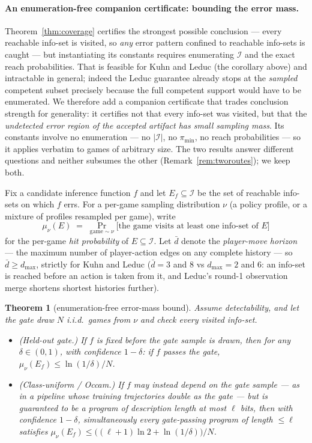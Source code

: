 \documentclass[11pt]{article}
\newtheorem{theorem}{Theorem}
\theoremstyle{remark}
\newcommand{\dmax}{d_{\max}}
\newcommand{\Ireach}{\mathcal{I}}
\begin{document}
\paragraph{An enumeration-free companion certificate: bounding the error mass.}
Theorem~\ref{thm:coverage} certifies the strongest possible conclusion --- every reachable info-set is visited, so \emph{any} error pattern confined to reachable info-sets is caught --- but instantiating its constants requires enumerating $\Ireach$ and the exact reach probabilities. That is feasible for Kuhn and Leduc (the corollary above) and intractable in general; indeed the Leduc guarantee already stops at the \emph{sampled} competent subset precisely because the full competent support would have to be enumerated. We therefore add a companion certificate that trades conclusion strength for generality: it certifies not that every info-set was visited, but that the \emph{undetected error region of the accepted artifact has small sampling mass}. Its constants involve no enumeration --- no $|\Ireach|$, no $\pi_{\min}$, no reach probabilities --- so it applies verbatim to games of arbitrary size. The two results answer different questions and neither subsumes the other (Remark~\ref{rem:tworoutes}); we keep both.

Fix a candidate inference function $f$ and let $E_f \subseteq \Ireach$ be the set of reachable info-sets on which $f$ errs. For a per-game sampling distribution $\nu$ (a policy profile, or a mixture of profiles resampled per game), write
\[
\mu_\nu(E) \;=\; \Pr_{\text{game} \sim \nu}\!\big[\text{the game visits at least one info-set of } E\big]
\]
for the per-game \emph{hit probability} of $E \subseteq \Ireach$. Let $\bar d$ denote the \emph{player-move horizon} --- the maximum number of player-action edges on any complete history --- so $\bar d \geq \dmax$, strictly for Kuhn and Leduc ($\bar d = 3$ and $8$ vs $\dmax = 2$ and $6$: an info-set is reached before an action is taken from it, and Leduc's round-1 observation merge shortens shortest histories further).

\begin{theorem}[enumeration-free error-mass bound]
\label{thm:errormass}
Assume detectability, and let the gate draw $N$ i.i.d.\ games from $\nu$ and check every visited info-set.
\begin{itemize}
\item[(i)] (\emph{Held-out gate.}) If $f$ is fixed before the gate sample is drawn, then for any $\delta \in (0,1)$, with confidence $1-\delta$: if $f$ passes the gate, $\mu_\nu(E_f) \leq \ln(1/\delta)/N$.
\item[(ii)] (\emph{Class-uniform / Occam.}) If $f$ may instead depend on the gate sample --- as in a pipeline whose training trajectories double as the gate --- but is guaranteed to be a program of description length at most $\ell$ bits, then with confidence $1-\delta$, \emph{simultaneously} every gate-passing program of length $\leq \ell$ satisfies $\mu_\nu(E_f) \leq \big((\ell+1)\ln 2 + \ln(1/\delta)\big)/N$.
\end{itemize}
\end{theorem}
\end{document}
